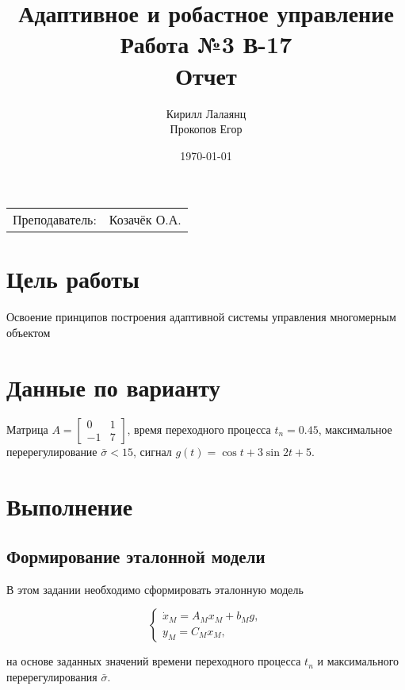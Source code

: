 \documentclass{article}
\title{Адаптивное и робастное управление \\ Работа №3 В-17\\ Отчет} %
\author{Кирилл Лалаянц \\ Прокопов Егор} %
\date{\today} %
\begin{document}
\maketitle %

\begin{center}
\begin{tabular}{l r}
Преподаватель: & Козачёк О.А. %
\end{tabular}
\end{center}
\newpage

\section{Цель работы}
Освоение принципов построения адаптивной системы управления многомерным объектом

\section{Данные по варианту}
Матрица $A =\begin{bmatrix} 0 & 1 \\ -1 & 7\end{bmatrix}$, время переходного процесса $t_n = 0.45$, максимальное перерегулирование $\bar{\sigma} < 15$, сигнал $g(t) = \cos t + 3\sin 2t + 5$.

\section{Выполнение}
\subsection{Формирование эталонной модели}
В этом задании необходимо сформировать эталонную модель

$$
\begin{cases}
\dot x_M = A_Mx_M + b_Mg, \\
y_M = C_Mx_M,
\end{cases}
$$

на основе заданных значений времени переходного процесса $t_n$ и максимального перерегулирования $\bar\sigma$.
\end{document}
